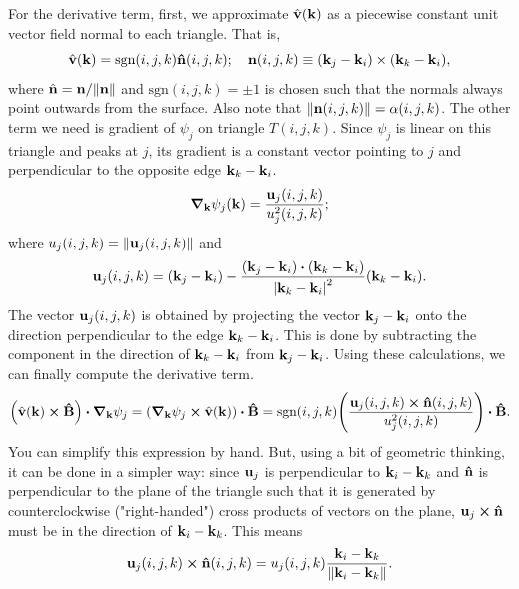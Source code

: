 \documentclass[12pt]{article}
\begin{document}
For the derivative term, first, we approximate $\hat{\vb{v}}(\vb{k})$ as a piecewise constant
unit vector field normal to each triangle. That is,
\begin{equation}
\hat{\vb{v}}(\vb{k}) = \text{sgn}(i,j,k) \vu{n}(i,j,k); \quad
\vb{n}(i,j,k) \equiv (\vb{k}_j - \vb{k}_i) \times (\vb{k}_k - \vb{k}_i),
\end{equation}
where $\hat{\vb{n}} = \vb{n}/\norm{\vb{n}}$ and $\text{sgn}(i,j,k) = \pm1$ is chosen such that
the normals always point outwards from the surface.
Also note that $\norm{\vb{n}(i,j,k)} = \alpha(i,j,k)$. The other term we need is gradient of
$\psi_j$ on triangle $T(i,j,k)$. Since $\psi_j$ is linear on this triangle and peaks at $j$,
its gradient is a constant vector pointing to $j$ and perpendicular to the opposite edge
$\vb{k}_k - \vb{k}_i$.
\begin{equation}
\grad_{\vb{k}} \psi_j(\vb{k}) = \frac{\vb{u}_j(i,j,k)}{u^2_j(i,j,k)};
\end{equation}
where $u_j(i,j,k) = \norm{\vb{u}_j(i,j,k)}$ and
\begin{equation}
\vb{u}_j(i,j,k) = (\vb{k}_j - \vb{k}_i)
- \frac{(\vb{k}_j-\vb{k}_i)\vdot(\vb{k}_k-\vb{k}_i)}{\abs{\vb{k}_k - \vb{k}_i}^2}
(\vb{k}_k - \vb{k}_i).
\end{equation}
The vector $\vb{u}_j(i,j,k)$ is obtained by projecting the vector $\vb{k}_j - \vb{k}_i$ onto the
direction perpendicular to the edge $\vb{k}_k - \vb{k}_i$. This is done by subtracting the component
in the direction of $\vb{k}_k - \vb{k}_i$ from $\vb{k}_j - \vb{k}_i$. Using these calculations, we
can finally compute the derivative term.
\begin{equation}
    \qty(\hat{\vb{v}}(\vb{k})\cross\vu{B})\vdot\grad_{\vb{k}}\psi_j
    = \qty(\grad_{\vb{k}}\psi_j\cross\hat{\vb{v}}(\vb{k}))\vdot\vu{B}
    = \text{sgn}(i,j,k)\qty(\frac{\vb{u}_j(i,j,k)\cross\vu{n}(i,j,k)}{u^2_j(i,j,k)})\vdot\vu{B}.
\end{equation}
You can simplify this expression by hand. But, using a bit of geometric thinking, it can be done
in a simpler way: since $\vb{u}_j$ is perpendicular to $\vb{k}_i - \vb{k}_k$ and $\vu{n}$ is
perpendicular to the plane of the triangle such that it is generated by counterclockwise
("right-handed") cross products of vectors on the plane, $\vb{u}_j\cross\vu{n}$ must be in the
direction of $\vb{k}_i - \vb{k}_k$. This means
\begin{equation}
    \vb{u}_j(i,j,k)\cross\vu{n}(i,j,k) = u_j(i,j,k)
    \frac{\vb{k}_i-\vb{k}_k}{\norm{\vb{k}_i-\vb{k}_k}}.
\end{equation}
\end{document}
